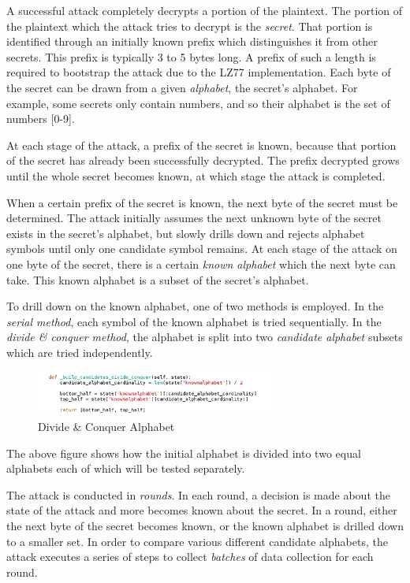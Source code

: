 A successful attack completely decrypts a portion of the plaintext. The portion
of the plaintext which the attack tries to decrypt is the \textit{secret}. That
portion is identified through an initially known prefix which distinguishes it
from other secrets. This prefix is typically 3 to 5 bytes long. A prefix
of such a length is required to bootstrap the attack due to the LZ77 implementation. Each byte of
the secret can be drawn from a given \textit{alphabet}, the secret's alphabet. For
example, some secrets only contain numbers, and so their alphabet is the set of
numbers [0-9].

At each stage of the attack, a prefix of the secret is known, because that
portion of the secret has already been successfully decrypted. The prefix
decrypted grows until the whole secret becomes known, at which stage the attack
is completed.

When a certain prefix of the secret is known, the next byte of the secret must
be determined. The attack initially assumes the next unknown byte of the secret
exists in the secret's alphabet, but slowly drills down and rejects
alphabet symbols until only one candidate symbol remains. At each stage of the
attack on one byte of the secret, there is a certain \textit{known alphabet} which
the next byte can take. This known alphabet is a subset of the secret's
alphabet.

To drill down on the known alphabet, one of two methods is employed. In the
\textit{serial method}, each symbol of the known alphabet is tried sequentially. In
the \textit{divide \& conquer method}, the alphabet is split into two \textit{candidate
alphabet} subsets which are tried independently.


\begin{figure}[H] \caption{Divide \& Conquer Alphabet} \centering
\includegraphics[width=0.7\textwidth]{diagrams/divideconquer.png}\end{figure}


The above figure shows how the initial alphabet is divided into two equal alphabets
each of which will be tested separately.

The attack is conducted in \textit{rounds}. In each round, a decision is made
about the state of the attack and more becomes known about the secret. In a
round, either the next byte of the secret becomes known, or the known alphabet
is drilled down to a smaller set. In order to compare various different
candidate alphabets, the attack executes a series of steps to collect
\textit{batches} of data collection for each round.

